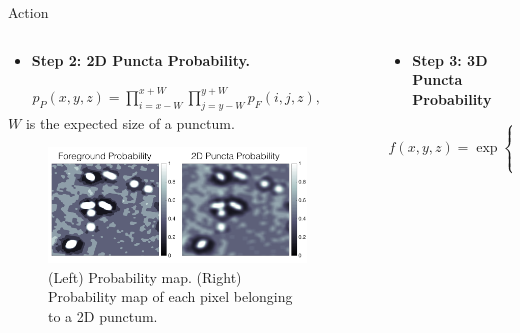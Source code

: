 \documentclass[final, table]{beamer}
\newlength{\sepwid}
\newlength{\onecolwid}
\newlength{\twocolwid}
\begin{document}
\begin{frame}[t]
\begin{columns}[t]
\begin{column}{\twocolwid}
\begin{block}{Action}
\begin{columns}[t]
\begin{column}{\onecolwid}

\begin{itemize} 
\item \textbf{Step 2: 2D Puncta Probability.}  %
\end{itemize} 


\begin{align} 
p_P(x, y, z) = \prod_{i=x-W}^{x+W} \prod_{j=y-W}^{y+W} p_F(i,j, z),
\end{align} 
$W$ is the expected size of a punctum.  %
\begin{figure}[!h]
\includegraphics[width=1\textwidth]{figs/prob_conv}
\caption{(Left) Probability map. (Right) Probability map of each pixel belonging to a 2D punctum.}
\label{fig:prob_conv}
\end{figure}


\end{column}


\begin{column}{\sepwid}\end{column}  %
\begin{column}{\onecolwid}
\begin{itemize} 
\item \textbf{Step 3: 3D Puncta Probability} %
\end{itemize} 

\begin{equation} 
f(x, y, z) = \exp \left \{- \sum_{j=j_{start}}^{j=j_{end}} [p_P(x, y, z) - p_P(x, y, z+j)]^2 \right \}
\label{eq:factor}
\end{equation} 


\end{column}
\end{columns}
\end{block}
\end{column}
\end{columns}
\end{frame}
\end{document}
